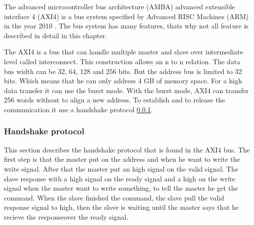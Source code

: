  
The  advanced microcontroller bus architecture (AMBA) advanced extensible interface 4 (AXI4) is a bus system specified by Advanced RISC Machines (ARM) in the year 2010 \cite{6129797}. The bus system has many features, thats why not all feature is described in detail in this chapter.

The AXI4 is a bus that can handle multiple master and slave over intermediate level called interconnect. This construction allows an n to n relation. The data bus width can be 32, 64, 128 and 256 bits. But the address bus is limited to 32 bits. Which means that he can only address 4 GB of memory space. For a high data transfer it can use the burst mode. With the burst mode, AXI4 can transfer 256 words without to align a new address. To establish and to release the communication it use a handshake protocol \cref{section:handshake}\cite{6129797}. 

\subsubsection{Handshake protocol}
\label{section:handshake}

This section describes the handshake protocol that is found in the AXI4 bus. The first step is that the master put on the address and when he want to write the write signal. After that the master put an high signal on the valid signal. The slave response with a high signal on the ready signal and a high on the write signal when the master want to write something, to tell the master he get the command. When the slave finished the command, the slave pull the valid response signal to high, then the slave is waiting until the master says that he recieve the responseover the ready signal.


